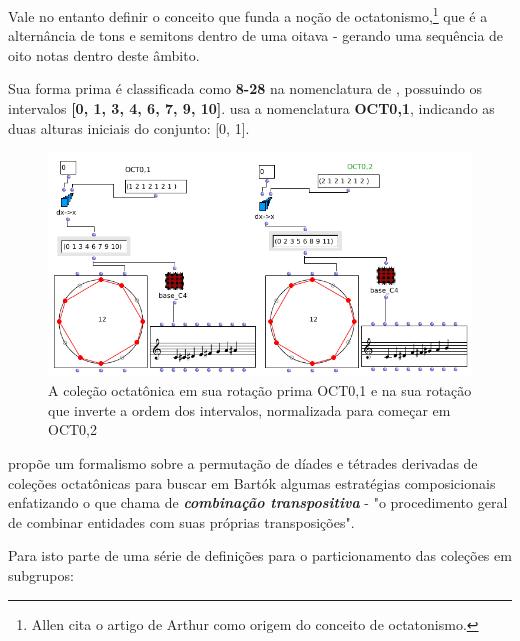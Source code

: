 \documentclass[
	12pt,				%
	openright,			%
	twoside,			%
	a4paper,			%
	english,			%
	french,				%
	spanish,			%
	brazil				%
	]{abntex2}
\begin{document}
Vale  no entanto definir o conceito que funda a noção de octatonismo,\footnote{Allen  cita o artigo de Arthur  como origem do conceito de octatonismo.} que é a alternância de tons e semitons dentro de uma oitava - gerando uma sequência de oito notas dentro deste âmbito. 

Sua forma prima é classificada como\textbf{ 8-28} na nomenclatura de , possuindo os intervalos \textbf{[0, 1, 3, 4, 6, 7, 9, 10]}.  usa a nomenclatura  \textbf{OCT0,1}, indicando as duas alturas iniciais do conjunto: [0, 1].

\begin{figure}[!h]
	\caption{\label{fig_grafico} A coleção octatônica em sua rotação prima OCT0,1 e na sua rotação que inverte a ordem dos intervalos, normalizada para começar em OCT0,2}
	\begin{center}
	    \includegraphics[scale=0.5]{octa/octaOM.png}
	\end{center}
\end{figure}

 propõe um formalismo sobre a permutação de díades e tétrades derivadas de coleções octatônicas para buscar em Bartók algumas estratégias composicionais enfatizando o que chama de \textbf{\textit{combinação transpositiva}} - "o procedimento geral de combinar entidades com suas próprias transposições". \cite[p. x]{cohn1991bartok}

Para isto  parte de uma série de definições para o particionamento das coleções em subgrupos:
\end{document}
